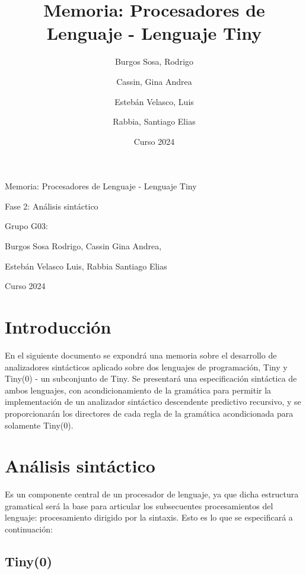 \documentclass[11pt]{article}
\title{Memoria: Procesadores de Lenguaje - Lenguaje Tiny}
\author{Burgos Sosa, Rodrigo \and Cassin, Gina Andrea \and Estebán Velasco, Luis \and Rabbia, Santiago Elias}
\date{Curso 2024}
\begin{document}
\begin{titlepage}
    \centering
    {\Huge Memoria: Procesadores de Lenguaje - Lenguaje Tiny \par}
    \vspace{1cm}
    {\Large Fase 2: Análisis sintáctico \par}
    \vspace{2cm}
    {\Large Grupo G03: \par}
    {\Large Burgos Sosa Rodrigo, Cassin Gina Andrea, \par}
    {\Large Estebán Velasco Luis, Rabbia Santiago Elias \par}
    \vspace{2cm}
    {\Large Curso 2024 \par}
\end{titlepage}
\thispagestyle{empty}

    \newpage

    \section{Introducción}
        En el siguiente documento se expondrá una memoria sobre el desarrollo de analizadores sintácticos aplicado sobre dos lenguajes de programación, Tiny y Tiny(0) - un subconjunto de Tiny.
        Se presentará una especificación sintáctica de ambos lenguajes, con acondicionamiento de la gramática para permitir la implementación de un analizador
        sintáctico descendente predictivo recursivo, y se proporcionarán los directores de cada regla de la gramática acondicionada para solamente Tiny(0).

    \section{Análisis sintáctico}
        Es un componente central de un procesador de lenguaje, ya que dicha estructura gramatical será la base para articular los subsecuentes
        procesamientos del lenguaje: procesamiento dirigido por la sintaxis. Esto es lo que se especificará a continuación:
    
        \subsection{Tiny(0)}
\end{document}
